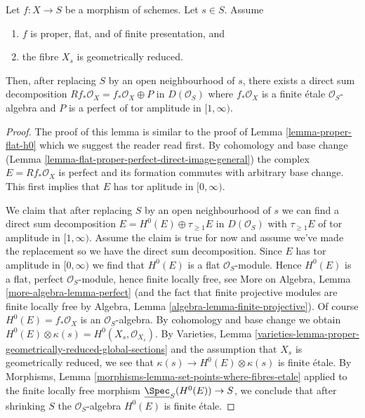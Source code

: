 \begin{lemma}
\label{lemma-proper-flat-geom-red}
Let $f : X \to S$ be a morphism of schemes. Let $s \in S$. Assume
\begin{enumerate}
\item $f$ is proper, flat, and of finite presentation, and
\item the fibre $X_s$ is geometrically reduced.
\end{enumerate}
Then, after replacing $S$ by an open neighbourhood of $s$, there
exists a direct sum decomposition
$Rf_*\mathcal{O}_X = f_*\mathcal{O}_X \oplus P$
in $D(\mathcal{O}_S)$ where $f_*\mathcal{O}_X$ is a finite \'etale
$\mathcal{O}_S$-algebra and
$P$ is a perfect of tor amplitude in $[1, \infty)$.
\end{lemma}

\begin{proof}
The proof of this lemma is similar to the proof of
Lemma \ref{lemma-proper-flat-h0}
which we suggest the reader read first.
By cohomology and base change
(Lemma \ref{lemma-flat-proper-perfect-direct-image-general})
the complex $E = Rf_*\mathcal{O}_X$
is perfect and its formation commutes with arbitrary base change.
This first implies that $E$ has tor aplitude in $[0, \infty)$.

\medskip\noindent
We claim that after replacing $S$ by an open neighbourhood of
$s$ we can find a direct sum decomposition
$E = H^0(E) \oplus \tau_{\geq 1}E$ in $D(\mathcal{O}_S)$
with $\tau_{\geq 1}E$ of tor amplitude in $[1, \infty)$.
Assume the claim is true for now and assume we've made the replacement
so we have the direct sum decomposition.
Since $E$ has tor amplitude in $[0, \infty)$ we find that
$H^0(E)$ is a flat $\mathcal{O}_S$-module.
Hence $H^0(E)$ is a flat, perfect $\mathcal{O}_S$-module,
hence finite locally free, see
More on Algebra, Lemma \ref{more-algebra-lemma-perfect}
(and the fact that finite projective modules are finite locally free by
Algebra, Lemma \ref{algebra-lemma-finite-projective}).
Of course $H^0(E) = f_*\mathcal{O}_X$ is an $\mathcal{O}_S$-algebra.
By cohomology and base change we obtain
$H^0(E) \otimes \kappa(s) = H^0(X_s, \mathcal{O}_{X_s})$.
By Varieties, Lemma
\ref{varieties-lemma-proper-geometrically-reduced-global-sections}
and the assumption that $X_s$ is geometrically reduced, we
see that $\kappa(s) \to H^0(E) \otimes \kappa(s)$
is finite \'etale. By Morphisms, Lemma
\ref{morphisms-lemma-set-points-where-fibres-etale}
applied to the finite locally free morphism
$\underline{\Spec}_S(H^0(E)) \to S$,
we conclude that after shrinking $S$ the $\mathcal{O}_S$-algebra
$H^0(E)$ is finite \'etale.


\end{proof}
